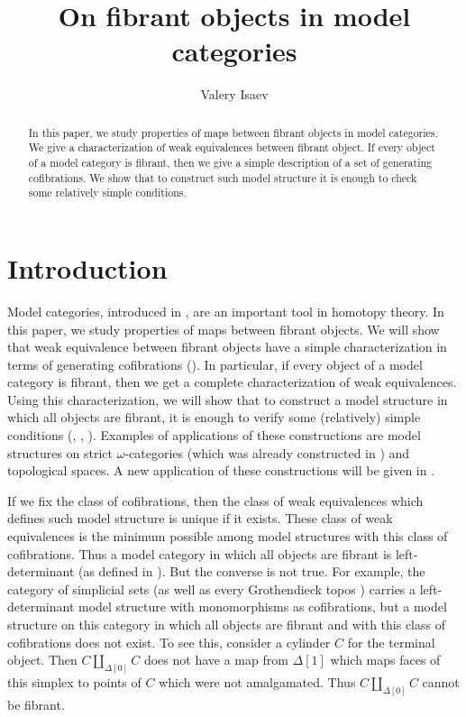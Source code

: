 \documentclass[reqno]{amsart}
\author{Valery Isaev}
\title{On fibrant objects in model categories}
\theoremstyle{definition}
\begin{document}
\begin{abstract}
In this paper, we study properties of maps between fibrant objects in model categories.
We give a characterization of weak equivalences between fibrant object.
If every object of a model category is fibrant, then we give a simple description of a set of generating cofibrations.
We show that to construct such model structure it is enough to check some relatively simple conditions.
\end{abstract}

\maketitle

\section{Introduction}

Model categories, introduced in \cite{quillen}, are an important tool in homotopy theory.
In this paper, we study properties of maps between fibrant objects.
We will show that weak equivalence between fibrant objects have a simple characterization in terms of generating cofibrations ().
In particular, if every object of a model category is fibrant, then we get a complete characterization of weak equivalences.
Using this characterization, we will show that to construct a model structure in which all objects are fibrant,
it is enough to verify some (relatively) simple conditions (, , ).
Examples of applications of these constructions are model structures on strict $\omega$-categories (which was already constructed in \cite{folk}) and topological spaces.
A new application of these constructions will be given in \cite{alg-models}.

If we fix the class of cofibrations, then the class of weak equivalences which defines such model structure is unique if it exists.
These class of weak equivalences is the minimum possible among model structures with this class of cofibrations.
Thus a model category in which all objects are fibrant is left-determinant (as defined in \cite{left-det}).
But the converse is not true.
For example, the category of simplicial sets (as well as every Grothendieck topos \cite{cisinski})
carries a left-determinant model structure with monomorphisms as cofibrations,
but a model structure on this category in which all objects are fibrant and with this class of cofibrations does not exist.
To see this, consider a cylinder $C$ for the terminal object.
Then $C \amalg_{\Delta[0]} C$ does not have a map from $\Delta[1]$ which
maps faces of this simplex to points of $C$ which were not amalgamated.
Thus $C \amalg_{\Delta[0]} C$ cannot be fibrant.
\end{document}
